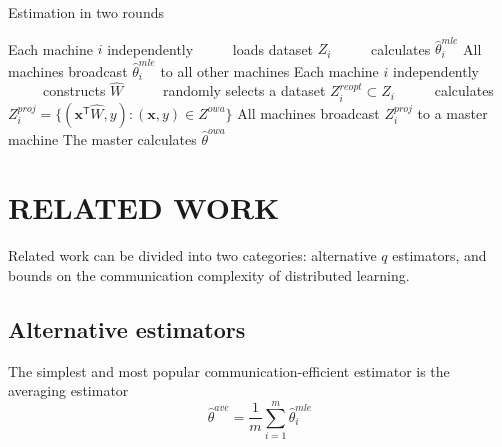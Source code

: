 \documentclass[twoside]{article}
\newcommand{\Zproj}{Z^{\textit{proj}}}
\newcommand{\Zreopt}{Z^{\textit{owa}}}
\newcommand{\x}{\mathbf{x}}
\newcommand{\w}{\theta}
\newcommand{\wreopt}{\hat\w^{owa}}
\newcommand{\wave}{\hat\w^{ave}}
\newcommand{\wmle}{\hat\w^{mle}}
\newcommand{\trans}[1]{\ensuremath{{#1}^{\mathsf{T}}}}
\begin{document}
\begin{algorithm}[t]
\caption{Estimation in two rounds}
\label{alg:distributed}
\begin{algorithmic}
\State Each machine $i$ independently
\State ~~~~~loads dataset $Z_i$
\State ~~~~~calculates $\wmle_i$
\State All machines broadcast $\wmle_i$ to all other machines
\State Each machine $i$ independently
\State ~~~~~constructs $\hat W$
\State ~~~~~randomly selects a dataset $Z^{reopt}_i\subset Z_i$
\State ~~~~~calculates $\Zproj_i=\{(\trans\x\hat W,y) : (\x,y)\in\Zreopt\}$
\State All machines broadcast $\Zproj_i$ to a master machine
\State The master calculates $\wreopt$
\end{algorithmic}
\label{fig:alg2}
\end{algorithm}


\section{RELATED WORK}

Related work can be divided into two categories:
alternative $q$ estimators,
and bounds on the communication complexity of distributed learning.

\subsection{Alternative estimators}
\label{sec:alt}
The simplest and most popular communication-efficient estimator is the averaging estimator
\begin{equation}
\wave = \frac{1}{m}\sum_{i=1}^m \wmle_i
\end{equation}
\end{document}
